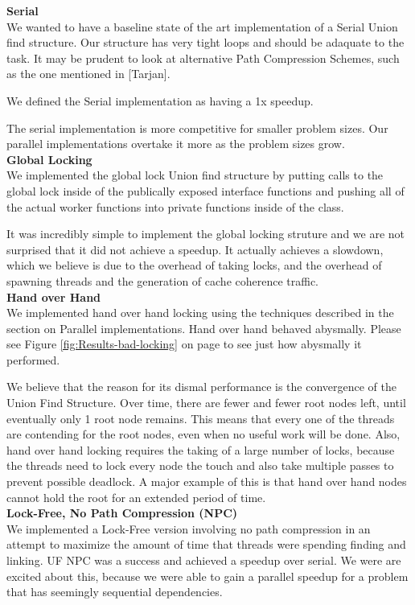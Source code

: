 \documentclass[11pt]{article}
\begin{document}
\textbf{Serial}\\
We wanted to have a baseline state of the art implementation of a Serial Union find structure. Our structure has very tight loops and should be adaquate to the task. It may be prudent to look at alternative Path Compression Schemes, such as the one mentioned in [Tarjan].

We defined the Serial implementation as having a 1x speedup.

The serial implementation is more competitive for smaller problem sizes. Our parallel implementations overtake it more as the problem sizes grow.\\


\textbf{Global Locking}\\
We implemented the global lock Union find structure by putting calls to the global lock inside of the publically exposed interface functions and pushing all of the actual worker functions into private functions inside of the class.

It was incredibly simple to implement the global locking struture and we are not surprised that it did not achieve a speedup. It actually achieves a slowdown, which we believe is due to the overhead of taking locks, and the overhead of spawning threads and the generation of cache coherence traffic.\\


\textbf{Hand over Hand}\\
We implemented hand over hand locking using the techniques described in the section on Parallel implementations. Hand over hand behaved abysmally. Please see Figure \ref{fig:Results-bad-locking} on page \pageref{fig:Results-bad-locking} to see just how abysmally it performed.

We believe that the reason for its dismal performance is the convergence of the Union Find Structure. Over time, there are fewer and fewer root nodes left, until eventually only 1 root node remains. This means that every one of the threads are contending for the root nodes, even when no useful work will be done. Also, hand over hand locking requires the taking of a large number of locks, because the threads need to lock every node the touch and also take multiple passes to prevent possible deadlock. A major example of this is that hand over hand nodes cannot hold the root for an extended period of time.\\


\textbf{Lock-Free, No Path Compression (NPC)}\\
We implemented a Lock-Free version involving no path compression in an attempt to maximize the amount of time that threads were spending finding and linking. UF NPC was a success and achieved a speedup over serial. We were are excited about this, because we were able to gain a parallel speedup for a problem that has seemingly sequential dependencies.
\end{document}
